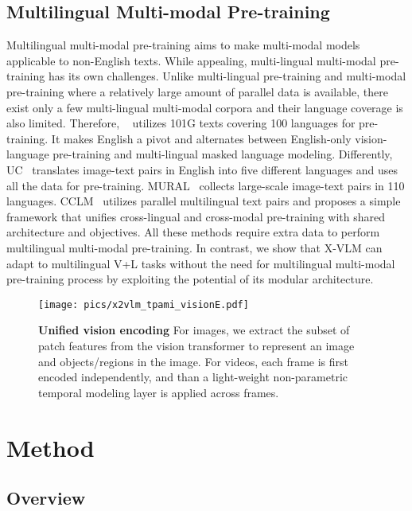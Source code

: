 \documentclass{article}
\newcommand{\baby}{X-VLM\xspace}
\begin{document}
\subsection{Multilingual Multi-modal Pre-training}
Multilingual multi-modal pre-training aims to make multi-modal models applicable to non-English texts. While appealing, multi-lingual multi-modal pre-training has its own challenges. Unlike multi-lingual pre-training and multi-modal pre-training where a relatively large amount of parallel data is available, there exist only a few multi-lingual multi-modal corpora and their language coverage is also limited. Therefore, ~\cite{ni2021m3p} utilizes 101G texts covering 100 languages for pre-training. It makes English a pivot and alternates between English-only vision-language pre-training and multi-lingual masked language modeling. Differently, UC~\cite{zhou2021uc2} translates image-text pairs in English into five different languages and uses all the data for pre-training. MURAL~\cite{jain2021mural} collects large-scale image-text pairs in 110 languages. CCLM~\cite{cclm} utilizes parallel multilingual text pairs and proposes a simple framework that unifies cross-lingual and cross-modal pre-training with shared architecture and objectives. All these methods require extra data to perform multilingual multi-modal pre-training. In contrast, we show that \baby can adapt to multilingual V+L tasks without the need for multilingual multi-modal pre-training process by exploiting the potential of its modular architecture. \begin{figure}[t]
\begin{center}
\centerline{\texttt{[image: pics/x2vlm\_tpami\_visionE.pdf]}}
\caption{\textbf{Unified vision encoding} For images, we extract the subset of patch features from the vision transformer to represent an image and objects/regions in the image. For videos, each frame is first encoded independently, and than a light-weight non-parametric temporal modeling layer is applied across frames. }
\vspace{-0.5cm}
\label{Fig:vision}
\end{center}
\end{figure}

\section{Method}

\subsection{Overview}
\end{document}
